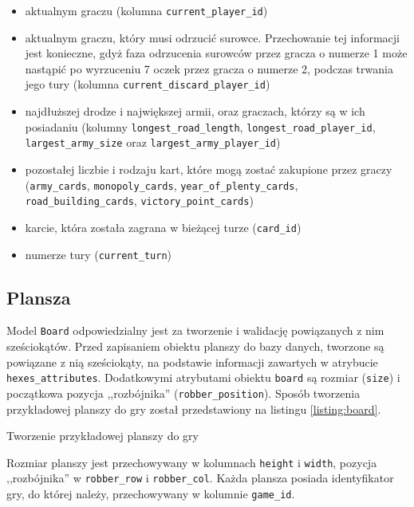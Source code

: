 \documentclass[11pt,twoside]{report}
\begin{document}
\begin{itemize}
\item aktualnym graczu (kolumna \texttt{current\_player\_id})
\item aktualnym graczu, który musi odrzucić surowce. Przechowanie tej
  informacji jest konieczne, gdyż faza odrzucenia surowców przez
  gracza o numerze 1 może nastąpić po wyrzuceniu 7 oczek przez gracza
  o numerze 2, podczas trwania jego tury (kolumna
  \texttt{current\_discard\_player\_id})
\item najdłuższej drodze i największej armii, oraz graczach, którzy są
  w ich posiadaniu (kolumny \texttt{longest\_road\_length},
  \texttt{longest\_road\_player\_id}, \texttt{largest\_army\_size}
  oraz \texttt{largest\_army\_player\_id})
\item pozostałej liczbie i rodzaju kart, które mogą zostać zakupione
  przez graczy (\texttt{army\_cards}, \texttt{monopoly\_cards},
  \texttt{year\_of\_plenty\_cards}, \texttt{road\_building\_cards},
  \texttt{victory\_point\_cards})
\item karcie, która została zagrana w bieżącej turze (\texttt{card\_id})
\item numerze tury (\texttt{current\_turn})
\end{itemize}

\subsection{Plansza}

Model \texttt{Board} odpowiedzialny jest za tworzenie i walidację
powiązanych z nim sześciokątów. Przed zapisaniem obiektu planszy do
bazy danych, tworzone są powiązane z nią sześciokąty, na podstawie
informacji zawartych w atrybucie
\texttt{hexes\_attributes}. Dodatkowymi atrybutami obiektu
\texttt{board} są rozmiar (\texttt{size}) i początkowa pozycja
,,rozbójnika'' (\texttt{robber\_position}). Sposób tworzenia
przykładowej planszy do gry został przedstawiony na listingu
\ref{listing:board}.

\begin{listing}
  
  \caption{Tworzenie przykładowej planszy do gry}
  \label{listing:board}
\end{listing}

Rozmiar planszy jest przechowywany w kolumnach \texttt{height} i
\texttt{width}, pozycja ,,rozbójnika'' w \texttt{robber\_row} i
\texttt{robber\_col}. Każda plansza posiada identyfikator gry, do
której należy, przechowywany w kolumnie \texttt{game\_id}.
\end{document}
